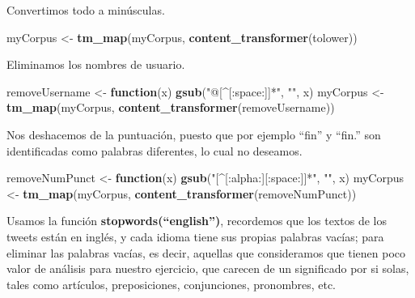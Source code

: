 \documentclass[]{article}
\newenvironment{Shaded}{\begin{snugshade}}{\end{snugshade}}
\newcommand{\ControlFlowTok}[1]{\textcolor[rgb]{0.13,0.29,0.53}{\textbf{#1}}}
\newcommand{\KeywordTok}[1]{\textcolor[rgb]{0.13,0.29,0.53}{\textbf{#1}}}
\newcommand{\NormalTok}[1]{#1}
\newcommand{\StringTok}[1]{\textcolor[rgb]{0.31,0.60,0.02}{#1}}
\begin{document}
Convertimos todo a minúsculas.

\begin{Shaded}
\begin{Highlighting}[]
\NormalTok{myCorpus <-}\StringTok{ }\KeywordTok{tm_map}\NormalTok{(myCorpus, }\KeywordTok{content_transformer}\NormalTok{(tolower))}
\end{Highlighting}
\end{Shaded}

Eliminamos los nombres de usuario.

\begin{Shaded}
\begin{Highlighting}[]
\NormalTok{removeUsername <-}\StringTok{ }\ControlFlowTok{function}\NormalTok{(x) }\KeywordTok{gsub}\NormalTok{(}\StringTok{"@[^[:space:]]*"}\NormalTok{, }\StringTok{""}\NormalTok{, x)  }
\NormalTok{myCorpus <-}\StringTok{ }\KeywordTok{tm_map}\NormalTok{(myCorpus, }\KeywordTok{content_transformer}\NormalTok{(removeUsername))}
\end{Highlighting}
\end{Shaded}

Nos deshacemos de la puntuación, puesto que por ejemplo ``fin'' y
``fin.'' son identificadas como palabras diferentes, lo cual no
deseamos.

\begin{Shaded}
\begin{Highlighting}[]
\NormalTok{removeNumPunct <-}\StringTok{ }\ControlFlowTok{function}\NormalTok{(x) }\KeywordTok{gsub}\NormalTok{(}\StringTok{"[^[:alpha:][:space:]]*"}\NormalTok{, }\StringTok{""}\NormalTok{, x)   }
\NormalTok{myCorpus <-}\StringTok{ }\KeywordTok{tm_map}\NormalTok{(myCorpus, }\KeywordTok{content_transformer}\NormalTok{(removeNumPunct))}
\end{Highlighting}
\end{Shaded}

Usamos la función \textbf{stopwords(``english'')},
recordemos que los textos de los tweets están en inglés, y cada idioma
tiene sus propias palabras vacías; para eliminar las palabras vacías, es
decir, aquellas que consideramos que tienen poco valor de análisis para nuestro ejercicio, que carecen de un
significado por si solas, tales como artículos, preposiciones,
conjunciones, pronombres, etc.
\end{document}
